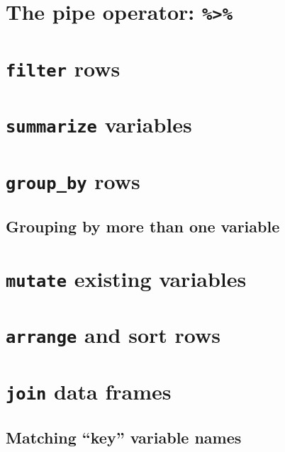 \documentclass[12pt, krantz2,]{krantz}
\begin{document}
\hypertarget{piping}{%
\section{\texorpdfstring{The pipe operator: \texttt{\%\textgreater{}\%}}{The pipe operator: \%\textgreater{}\%}}\label{piping}}

\hypertarget{filter}{%
\section{\texorpdfstring{\texttt{filter} rows}{filter rows}}\label{filter}}

\hypertarget{summarize}{%
\section{\texorpdfstring{\texttt{summarize} variables}{summarize variables}}\label{summarize}}

\hypertarget{groupby}{%
\section{\texorpdfstring{\texttt{group\_by} rows}{group\_by rows}}\label{groupby}}

\hypertarget{grouping-by-more-than-one-variable}{%
\subsection{Grouping by more than one variable}\label{grouping-by-more-than-one-variable}}

\hypertarget{mutate}{%
\section{\texorpdfstring{\texttt{mutate} existing variables}{mutate existing variables}}\label{mutate}}

\hypertarget{arrange}{%
\section{\texorpdfstring{\texttt{arrange} and sort rows}{arrange and sort rows}}\label{arrange}}

\hypertarget{joins}{%
\section{\texorpdfstring{\texttt{join} data frames}{join data frames}}\label{joins}}

\hypertarget{matching-key-variable-names}{%
\subsection{Matching ``key'' variable names}\label{matching-key-variable-names}}
\end{document}
